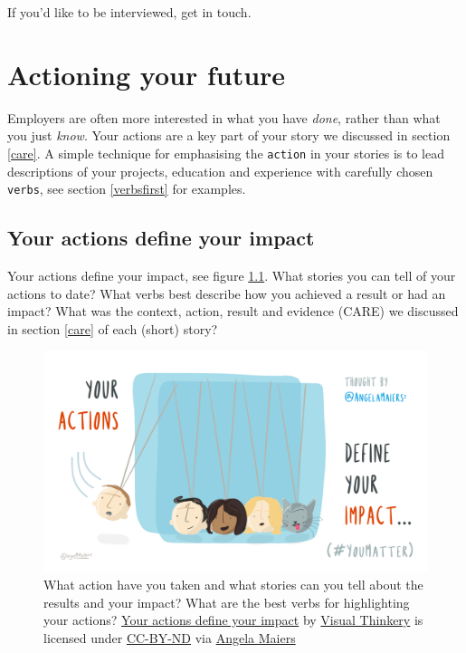 \documentclass[
]{book}
\begin{document}
If you'd like to be interviewed, get in touch.

\hypertarget{actioning}{%
\chapter{Actioning your future}\label{actioning}}

Employers are often more interested in what you have \emph{done}, rather than what you just \emph{know}. Your actions are a key part of your story we discussed in section \ref{care}. A simple technique for emphasising the \texttt{action} in your stories is to lead descriptions of your projects, education and experience with carefully chosen \texttt{verbs}, see section \ref{verbsfirst} for examples.

\hypertarget{impact}{%
\section{Your actions define your impact}\label{impact}}

Your actions define your impact, see figure \ref{fig:action-fig}. What stories you can tell of your actions to date? What verbs best describe how you achieved a result or had an impact? What was the context, action, result and evidence (CARE) we discussed in section \ref{care} of each (short) story?

\begin{figure}

{\centering \includegraphics[width=1\linewidth]{images/your-actions} 

}

\caption{What action have you taken and what stories can you tell about the results and your impact? What are the best verbs for highlighting your actions? \href{https://bryanmmathers.com/your-actions-define-your-impact/}{Your actions define your impact} by \href{https://visualthinkery.com/}{Visual Thinkery} is licensed under \href{https://creativecommons.org/licenses/by-nd/4.0/}{CC-BY-ND} via \href{https://twitter.com/AngelaMaiers}{Angela Maiers}}\label{fig:action-fig}
\end{figure}
\end{document}
